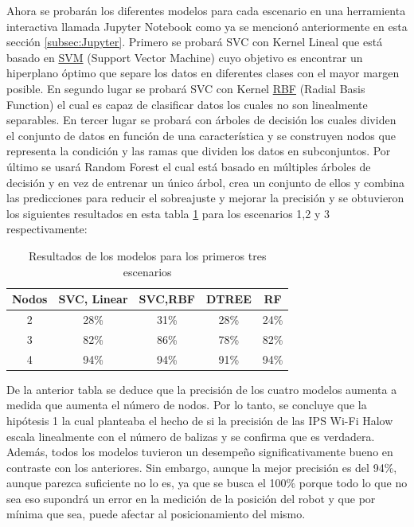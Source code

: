 Ahora se probarán los diferentes modelos para cada escenario en una herramienta interactiva llamada Jupyter Notebook como ya se mencionó anteriormente en esta sección \ref{subsec:Jupyter}. Primero se probará SVC con Kernel Lineal que está basado en \hyperlink{SVM}{SVM} (Support Vector Machine) cuyo objetivo es encontrar un hiperplano óptimo que separe los datos en diferentes clases con el mayor margen posible. En segundo lugar se probará SVC con Kernel \hyperlink{RBF}{RBF} (Radial Basis Function) el cual es capaz de clasificar datos los cuales no son linealmente separables. En tercer lugar se probará con árboles de decisión los cuales dividen el conjunto de datos en función de una característica y se construyen nodos que representa la condición y las ramas que dividen los datos en subconjuntos. Por último se usará Random Forest el cual está basado en múltiples árboles de decisión y en vez de entrenar un único árbol, crea un conjunto de ellos y combina las predicciones para reducir el sobreajuste y mejorar la precisión y se obtuvieron los siguientes resultados en esta tabla \ref{cuadro:tabla2} para los escenarios 1,2 y 3 respectivamente:


\begin{table}[H]
\begin{center}
\begin{tabular}{|c|c|c|c|c|}
\hline
\textbf{Nodos} & \textbf{SVC, Linear} & \textbf{SVC,RBF} & \textbf{DTREE} & \textbf{RF} \\
\hline
2 & 28\% & 31\% & 28\% & 24\% \\  
3 & 82\% & 86\% & 78\% & 82\% \\   
4 & 94\% & 94\% & 91\% & 94\% \\   
\hline
\end{tabular}
\caption{Resultados de los modelos para los primeros tres escenarios}
\label{cuadro:tabla2}
\end{center}
\end{table}


De la anterior tabla se deduce que la precisión de los cuatro modelos aumenta a medida que aumenta el número de nodos. Por lo tanto, se concluye que la hipótesis 1 la cual planteaba el hecho de si la precisión de las IPS Wi-Fi Halow escala linealmente con el número de balizas y se confirma que es verdadera. Además, todos los modelos tuvieron un desempeño significativamente bueno en contraste con los anteriores. Sin embargo, aunque la mejor precisión es del 94\%, aunque parezca suficiente no lo es, ya que se busca el 100\% porque todo lo que no sea eso supondrá un error en la medición de la posición del robot y que por mínima que sea, puede afectar al posicionamiento del mismo.

